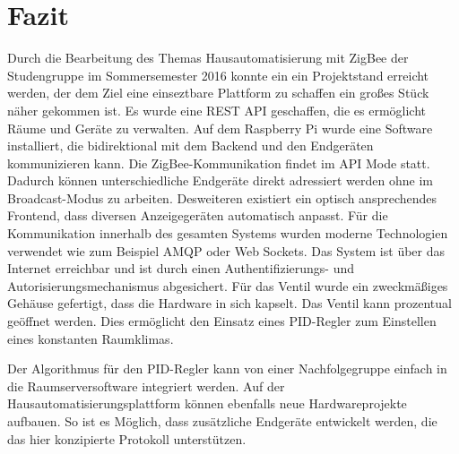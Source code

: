 \section{Fazit}
Durch die Bearbeitung des Themas Hausautomatisierung mit ZigBee der Studengruppe im Sommersemester 2016 konnte ein ein Projektstand erreicht werden, der dem Ziel eine einseztbare Plattform zu schaffen ein großes Stück näher gekommen ist. Es wurde eine REST API geschaffen, die es ermöglicht Räume und Geräte zu verwalten. Auf dem Raspberry Pi wurde eine Software installiert, die bidirektional mit dem Backend und den Endgeräten kommunizieren kann. Die ZigBee-Kommunikation findet im \ac{API Mode} statt. Dadurch können unterschiedliche Endgeräte direkt adressiert werden ohne im Broadcast-Modus zu arbeiten. Desweiteren existiert ein optisch ansprechendes Frontend, dass diversen Anzeigegeräten automatisch anpasst. Für die Kommunikation innerhalb des gesamten Systems wurden moderne Technologien verwendet wie zum Beispiel \ac{AMQP} oder Web Sockets. 
Das System ist über das Internet erreichbar und ist durch einen Authentifizierungs- und Autorisierungsmechanismus abgesichert. Für das Ventil wurde ein zweckmäßiges Gehäuse gefertigt, dass die Hardware in sich kapselt. Das Ventil kann prozentual geöffnet werden. Dies ermöglicht den Einsatz eines \ac{PID-Regler} zum Einstellen eines konstanten Raumklimas.

Der Algorithmus für den \ac{PID-Regler} kann von einer Nachfolgegruppe einfach in die Raumserversoftware integriert werden. Auf der Hausautomatisierungsplattform können ebenfalls neue Hardwareprojekte aufbauen. So ist es Möglich, dass zusätzliche Endgeräte entwickelt werden, die das hier konzipierte Protokoll unterstützen.
